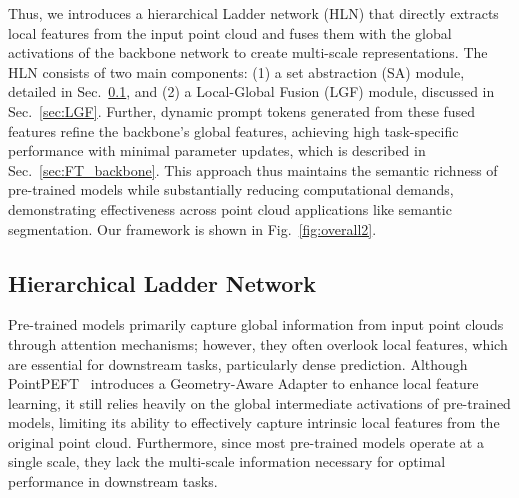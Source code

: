 



Thus, we introduces a hierarchical Ladder network (HLN) that directly extracts local features from the input point cloud and fuses them with the global activations of the backbone network to create multi-scale representations. The HLN consists of two main components: (1) a set abstraction (SA) module, detailed in Sec.~\ref{sec:HLN}, and (2) a Local-Global Fusion (LGF) module, discussed in Sec.~\ref{sec:LGF}. 
Further, dynamic prompt tokens generated from these fused features refine the backbone’s global features, achieving high task-specific performance with minimal parameter updates, which is described in Sec.~\ref{sec:FT_backbone}. This approach thus maintains the semantic richness of pre-trained models while substantially reducing computational demands, demonstrating effectiveness across point cloud applications like semantic segmentation.
Our framework is shown in Fig.~\ref{fig:overall2}.

\subsection{Hierarchical Ladder Network}
\label{sec:HLN}
Pre-trained models primarily capture global information from input point clouds through attention mechanisms; however, they often overlook local features, which are essential for downstream tasks, particularly dense prediction. Although PointPEFT~\cite{tang2024point} introduces a Geometry-Aware Adapter to enhance local feature learning, it still relies heavily on the global intermediate activations of pre-trained models, limiting its ability to effectively capture intrinsic local features from the original point cloud. Furthermore, since most pre-trained models operate at a single scale, they lack the multi-scale information necessary for optimal performance in downstream tasks.

